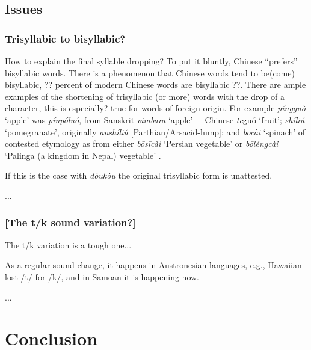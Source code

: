 \documentclass[12pt]{article}
\newcommand{\tc}[1]{\traditionalchinesefont{#1}\rmfamily}
\begin{document}
\subsection{Issues}

\subsubsection{Trisyllabic to bisyllabic?}

How to explain the final syllable dropping? To put it bluntly, Chinese ``prefers'' bisyllabic words. There is a phenomenon that Chinese words tend to be(come) bisyllabic, ?? percent of modern Chinese words are bisyllabic ??. There are ample examples of the shortening of trisyllabic (or more) words with the drop of a character, this is especially? true for words of foreign origin. For example \tc{蘋果} \textit{píngguǒ} `apple' was \tc{頻婆羅} \textit{pínpóluó}, from Sanskrit \textit{vimbara} `apple' + Chinese \textit{tc}{guǒ} `fruit'; \tc{石榴} \textit{shíliú} `pomegranate', originally \tc{安石榴} \textit{ānshíliú} [Parthian/Arsacid-lump]; and \tc{菠菜} \textit{bōcài} `spinach' of contested etymology as from either \tc{波斯菜} \textit{bōsīcài} `Persian vegetable' or \tc{波棱菜} \textit{bōléngcài} `Palinga (a kingdom in Nepal) vegetable' \parencite{shi_2021_loanwords}.

If this is the case with \textit{dòukòu} the original trisyllabic form is unattested.

...

\subsubsection{[The t/k sound variation?]}

The t/k variation is a tough one...

As a regular sound change, it happens in Austronesian languages, e.g., Hawaiian lost /t/ for /k/, and in Samoan it is happening now. 

...

\section{Conclusion}

\end{document}
